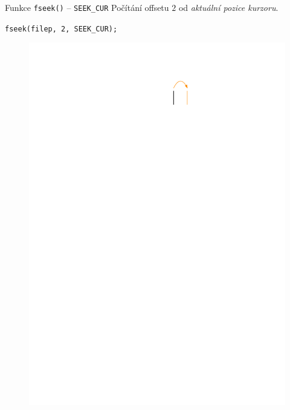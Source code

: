 \documentclass[14pt,aspectratio=169]{beamer}
\begin{document}
    \begin{frame}{Funkce \texttt{fseek()} -- \texttt{SEEK\_CUR}}
        Počítání offsetu $2$ od \emph{aktuální pozice kurzoru}.
        \begin{center}
            \texttt{fseek(filep, 2, SEEK\_CUR);}
        \end{center}
        \begin{figure}
            \centering
            \includegraphics[scale=1]{images/cursor_fseek1.pdf}
        \end{figure}
    \end{frame}
\end{document}
